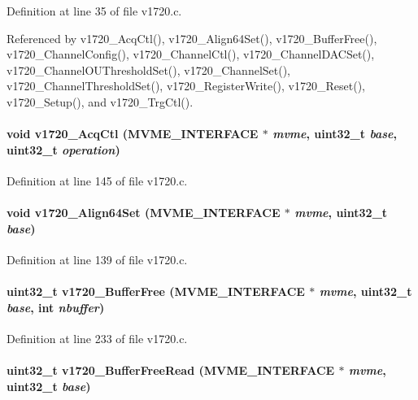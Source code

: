 Definition at line 35 of file v1720.c.

Referenced by v1720\_\-AcqCtl(), v1720\_\-Align64Set(), v1720\_\-BufferFree(), v1720\_\-ChannelConfig(), v1720\_\-ChannelCtl(), v1720\_\-ChannelDACSet(), v1720\_\-ChannelOUThresholdSet(), v1720\_\-ChannelSet(), v1720\_\-ChannelThresholdSet(), v1720\_\-RegisterWrite(), v1720\_\-Reset(), v1720\_\-Setup(), and v1720\_\-TrgCtl().
\paragraph[{v1720\_\-AcqCtl}]{\setlength{\rightskip}{0pt plus 5cm}void v1720\_\-AcqCtl ({\bf MVME\_\-INTERFACE} $\ast$ {\em mvme}, \/  uint32\_\-t {\em base}, \/  uint32\_\-t {\em operation})}\hfill\label{v1720_8c_a20269f7f5e904b3bf0d5b7d4f31d42b8}


Definition at line 145 of file v1720.c.
\paragraph[{v1720\_\-Align64Set}]{\setlength{\rightskip}{0pt plus 5cm}void v1720\_\-Align64Set ({\bf MVME\_\-INTERFACE} $\ast$ {\em mvme}, \/  uint32\_\-t {\em base})}\hfill\label{v1720_8c_a962f78126c5bc0ef1d424d1c45c53c85}


Definition at line 139 of file v1720.c.
\paragraph[{v1720\_\-BufferFree}]{\setlength{\rightskip}{0pt plus 5cm}uint32\_\-t v1720\_\-BufferFree ({\bf MVME\_\-INTERFACE} $\ast$ {\em mvme}, \/  uint32\_\-t {\em base}, \/  int {\em nbuffer})}\hfill\label{v1720_8c_a8e195a44d8038fe0e92cc5d52ad5420a}


Definition at line 233 of file v1720.c.
\paragraph[{v1720\_\-BufferFreeRead}]{\setlength{\rightskip}{0pt plus 5cm}uint32\_\-t v1720\_\-BufferFreeRead ({\bf MVME\_\-INTERFACE} $\ast$ {\em mvme}, \/  uint32\_\-t {\em base})}\hfill\label{v1720_8c_a04f2b6ca069e84bd50ab62c8db2883df}


